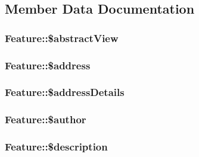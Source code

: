 \subsection{Member Data Documentation}
\hypertarget{classFeature_a853335604692396a24afc819cfa5fe18}{
\subsubsection[{\$abstractView}]{\setlength{\rightskip}{0pt plus 5cm}Feature::\$abstractView}}
\label{d5/d74/classFeature_a853335604692396a24afc819cfa5fe18}
\hypertarget{classFeature_aeda1858217ef0dd63453b8b5ff25e61c}{
\subsubsection[{\$address}]{\setlength{\rightskip}{0pt plus 5cm}Feature::\$address}}
\label{d5/d74/classFeature_aeda1858217ef0dd63453b8b5ff25e61c}
\hypertarget{classFeature_a97b441c0b078bfc1503fe573a8453089}{
\subsubsection[{\$addressDetails}]{\setlength{\rightskip}{0pt plus 5cm}Feature::\$addressDetails}}
\label{d5/d74/classFeature_a97b441c0b078bfc1503fe573a8453089}
\hypertarget{classFeature_a13785dc5508baa857708ee4439e4a3be}{
\subsubsection[{\$author}]{\setlength{\rightskip}{0pt plus 5cm}Feature::\$author}}
\label{d5/d74/classFeature_a13785dc5508baa857708ee4439e4a3be}
\hypertarget{classFeature_acab4748e1a229e9dd7fd0dc21bbae673}{
\subsubsection[{\$description}]{\setlength{\rightskip}{0pt plus 5cm}Feature::\$description}}
